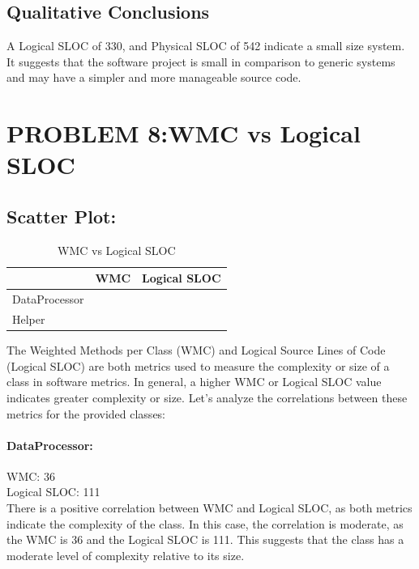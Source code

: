 \documentclass[runningheads]{llncs}
\begin{document}
\newpage
\subsection{Qualitative Conclusions}
A Logical SLOC of 330, and Physical SLOC of 542  indicate a small size system. It suggests that the software project is small in comparison to generic systems and may have a simpler and
more manageable source code.


\section{PROBLEM 8:WMC vs Logical SLOC}
\subsection{Scatter Plot:}

\begin{table}
\caption{WMC vs Logical SLOC}\label{tab3} %
\begin{tabularx}{1.0\textwidth} { 
  | >{\centering\arraybackslash}p{} 
  | >{\centering\arraybackslash}p{}
  | >{\centering\arraybackslash}X|  }
\hline
{\bfseries Class} & {\bfseries WMC} & {\bfseries Logical SLOC}\\
\hline
DataProcessor&  36 & 111 \\
Helper &  36 &104 \\
\hline
\end{tabularx}
\end{table}

The Weighted Methods per Class (WMC) and Logical Source Lines of Code (Logical SLOC) are both metrics used to measure the complexity or size of a class in software metrics. In general, a higher WMC or Logical SLOC value indicates greater complexity or size. Let's analyze the correlations between these metrics for the provided classes:

\paragraph{DataProcessor:\\}
WMC: 36 \\
Logical SLOC: 111 \\
There is a positive correlation between WMC and Logical SLOC, as both metrics indicate the complexity of the class. In this case, the correlation is moderate, as the WMC is 36 and the Logical SLOC is 111. This suggests that the class has a moderate level of complexity relative to its size.\\ \\
\end{document}
